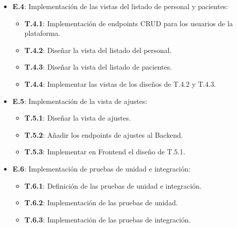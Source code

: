 \begin{itemize}
    \item \textbf{E.4}: Implementación de las vistas del listado de personal y pacientes:
    \begin{itemize}
        \item \textbf{T.4.1}: Implementación de endpoints CRUD para los usuarios de la plataforma.
        \item \textbf{T.4.2}: Diseñar la vista del listado del personal.
        \item \textbf{T.4.3}: Diseñar la vista del listado de pacientes.
        \item \textbf{T.4.4}: Implementar las vistas de los diseños de T.4.2 y T.4.3.
    \end{itemize}
    
    \item \textbf{E.5}: Implementación de la vista de ajustes:
    \begin{itemize}
        \item \textbf{T.5.1}: Diseñar la vista de ajustes.
        \item \textbf{T.5.2}: Añadir los endpoints de ajustes al Backend.
        \item \textbf{T.5.3}: Implementar en Frontend el diseño de T.5.1.
    \end{itemize}

    \item \textbf{E.6}: Implementación de pruebas de unidad e integración:
    \begin{itemize}
        \item \textbf{T.6.1}: Definición de las pruebas de unidad e integración.
        \item \textbf{T.6.2}: Implementación de las pruebas de unidad.
        \item \textbf{T.6.3}: Implementación de las pruebas de integración.
    \end{itemize}   
\end{itemize}

